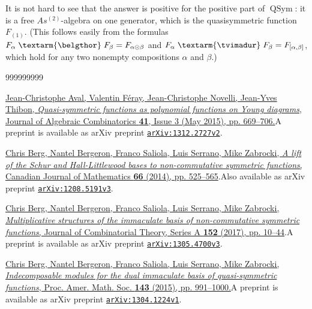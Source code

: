 \documentclass[numbers=enddot,12pt,final,onecolumn,notitlepage,abstracton]{scrartcl}%
\theoremstyle{definition}
\newcommand{\tvi}{\left. \textarm{\tvimadur} \right.}
\newcommand{\bel}{\left. \textarm{\belgthor} \right.}
\begin{document}
It is not hard to see that the answer is positive for the positive part of
$\operatorname*{QSym}$: it is a free $As^{\left(  2\right)  }$-algebra on one
generator, which is the quasisymmetric function $F_{\left(  1\right)  }$.
(This follows easily from the formulas $F_{\alpha} \bel F_{\beta}%
=F_{\alpha\odot\beta}$ and $F_{\alpha} \tvi F_{\beta}=F_{\left[  \alpha
,\beta\right]  }$, which hold for any two nonempty compositions $\alpha$ and
$\beta$.)

\begin{thebibliography}{999999999}                                                                                        %


%
\href{https://doi.org/10.1007/s10801-014-0549-y}{Jean-Christophe Aval,
Valentin F\'{e}ray, Jean-Christophe Novelli, Jean-Yves Thibon,
\textit{Quasi-symmetric functions as polynomial functions on Young diagrams},
Journal of Algebraic Combinatorics \textbf{41}, Issue 3 (May 2015), pp.
669--706.}\newline A preprint is available as arXiv preprint
\texttt{\href{https://arxiv.org/abs/1312.2727v2}{arXiv:1312.2727v2}}.

\href{https://doi.org/10.4153/CJM-2013-013-0}{Chris
Berg, Nantel Bergeron, Franco Saliola, Luis Serrano, Mike Zabrocki, \textit{A
lift of the Schur and Hall-Littlewood bases to non-commutative symmetric
functions}, Canadian Journal of Mathematics \textbf{66} (2014), pp.
525--565}.\newline Also available as arXiv preprint
\texttt{\href{https://arxiv.org/abs/1208.5191v3}{arXiv:1208.5191v3}}.

%
\href{https://doi.org/10.1016/j.jcta.2017.05.003}{Chris Berg, Nantel Bergeron,
Franco Saliola, Luis Serrano, Mike Zabrocki, \textit{Multiplicative structures
of the immaculate basis of non-commutative symmetric functions}, Journal of
Combinatorial Theory, Series A \textbf{152} (2017), pp. 10--44}.\newline A
preprint is available as arXiv preprint
\texttt{\href{https://arxiv.org/abs/1305.4700v3}{arXiv:1305.4700v3}}.

%
\href{https://doi.org/10.1090/S0002-9939-2014-12298-2}{Chris Berg, Nantel
Bergeron, Franco Saliola, Luis Serrano, Mike Zabrocki, \textit{Indecomposable
modules for the dual immaculate basis of quasi-symmetric functions}, Proc.
Amer. Math. Soc. \textbf{143} (2015), pp. 991--1000.}\newline A preprint is
available as arXiv preprint
\texttt{\href{https://arxiv.org/abs/1304.1224v1}{arXiv:1304.1224v1}}.


\end{thebibliography}
\end{document}
